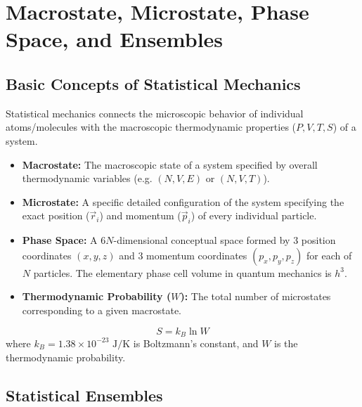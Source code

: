 \documentclass[12pt,a4paper]{article}
\begin{document}
\section{Macrostate, Microstate, Phase Space, and Ensembles}

\subsection{Basic Concepts of Statistical Mechanics}

Statistical mechanics connects the microscopic behavior of individual atoms/molecules with the macroscopic thermodynamic properties ($P, V, T, S$) of a system.

\begin{tcolorbox}[defbox, title={\textbf{Definitions: Macrostate, Microstate, and Phase Space}}]
\begin{itemize}[leftmargin=*, itemsep=2pt]
  \item \textbf{Macrostate:} The macroscopic state of a system specified by overall thermodynamic variables (e.g. $(N, V, E)$ or $(N, V, T)$).
  \item \textbf{Microstate:} A specific detailed configuration of the system specifying the exact position ($\vec{r}_i$) and momentum ($\vec{p}_i$) of every individual particle.
  \item \textbf{Phase Space:} A $6N$-dimensional conceptual space formed by 3 position coordinates $(x,y,z)$ and 3 momentum coordinates $(p_x,p_y,p_z)$ for each of $N$ particles. The elementary phase cell volume in quantum mechanics is $h^3$.
  \item \textbf{Thermodynamic Probability ($W$):} The total number of microstates corresponding to a given macrostate.
\end{itemize}
\end{tcolorbox}

\begin{tcolorbox}[formulabox, title={\textbf{Boltzmann Entropy Relation}}]
\begin{equation}
S = k_B \ln W
\end{equation}
where $k_B = 1.38 \times 10^{-23}\text{ J/K}$ is Boltzmann's constant, and $W$ is the thermodynamic probability.
\end{tcolorbox}

\subsection{Statistical Ensembles}
\end{document}
